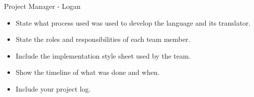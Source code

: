 Project Manager - Logan
\label{sec:project_plan}

\begin{itemize}
\item State what process used was used to develop the language and its translator.
\item State the roles and responsibilities of each team member.
\item Include the implementation style sheet used by the team.
\item Show the timeline of what was done and when.
\item Include your project log.
\end{itemize}
